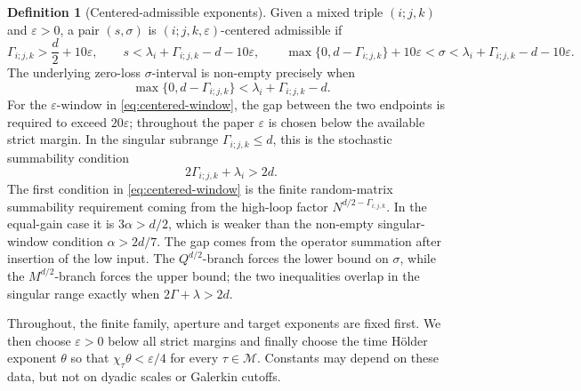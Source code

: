 \documentclass[11pt,reqno]{amsart}
\numberwithin{equation}{section}
\theoremstyle{plain}
\theoremstyle{definition}
\newtheorem{definition}[theorem]{Definition}
\newcommand{\cM}{\mathcal M}
\newcommand{\eps}{\varepsilon}
\begin{document}
\begin{definition}[Centered-admissible exponents]\label{def:admissible}
Given a mixed triple \((i;j,k)\) and \(\eps>0\), a pair \((s,\sigma)\) is \((i;j,k,\eps)\)-centered admissible if
\begin{equation}\label{eq:centered-window}
        \Gamma_{i;j,k}>\frac d2+10\eps,
        \qquad
        s<\lambda_i+\Gamma_{i;j,k}-d-10\eps,
        \qquad
        \max\{0,d-\Gamma_{i;j,k}\}+10\eps
        <\sigma<\lambda_i+\Gamma_{i;j,k}-d-10\eps .
\end{equation}
The underlying zero-loss \(\sigma\)-interval is non-empty precisely when
\begin{equation}\label{eq:nonempty-window}
        \max\{0,d-\Gamma_{i;j,k}\}<\lambda_i+\Gamma_{i;j,k}-d.
\end{equation}
For the \(\eps\)-window in \eqref{eq:centered-window}, the gap between
the two endpoints is required to exceed \(20\eps\); throughout the paper
\(\eps\) is chosen below the available strict margin.  In the singular subrange \(\Gamma_{i;j,k}\le d\), this is the stochastic summability condition
\begin{equation}\label{eq:nonempty-singular}
        2\Gamma_{i;j,k}+\lambda_i>2d.
\end{equation}
The first condition in \eqref{eq:centered-window} is the finite random-matrix summability requirement coming from the high-loop factor \(N^{d/2-\Gamma_{i;j,k}}\).  In the equal-gain case it is \(3\alpha>d/2\), which is weaker than the non-empty singular-window condition \(\alpha>2d/7\).  The gap comes from the operator summation after insertion of the low input.  The \(Q^{d/2}\)-branch forces the lower bound on \(\sigma\), while the \(M^{d/2}\)-branch forces the upper bound; the two inequalities overlap in the singular range exactly when \(2\Gamma+\lambda>2d\).
\end{definition}

Throughout, the finite family, aperture and target exponents are fixed
first.  We then choose \(\eps>0\) below all strict margins and finally choose
the time H\"older exponent \(\theta\) so that
\(\chi_\tau\theta<\eps/4\) for every \(\tau\in\cM\).  Constants may depend
on these data, but not on dyadic scales or Galerkin cutoffs.
\end{document}
